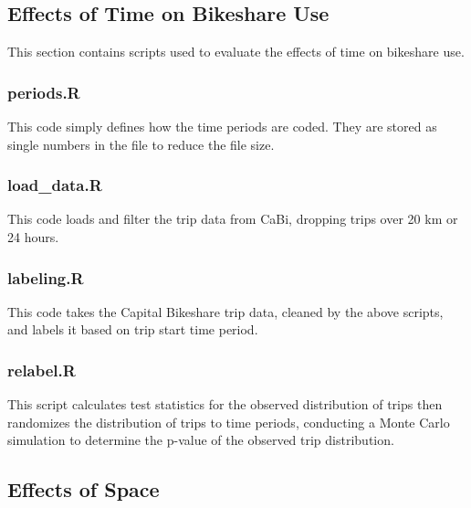 \documentclass[letterpaper,11pt]{article}
\begin{document}


\subsection{Effects of Time on Bikeshare Use}

This section contains scripts used to evaluate the effects of time on
bikeshare use.

\subsubsection{periods.R}
\label{periods.R}

This code simply defines how the time periods are coded. They are
stored as single numbers in the file to reduce the file size.



\subsubsection{load\_data.R}
\label{load_data.R}

This code loads and filter the trip data from CaBi, dropping trips
over 20 km or 24 hours.



\subsubsection{labeling.R}
\label{labeling.R}

This code takes the Capital Bikeshare trip data, cleaned by the above
scripts, and labels it based on trip start time period.



\subsubsection{relabel.R}
\label{relabel.R}

This script calculates test statistics for the observed distribution
of trips then randomizes the distribution of trips to time periods,
conducting a Monte Carlo simulation to determine the p-value of the
observed trip distribution.



\subsection{Effects of Space}
\end{document}
